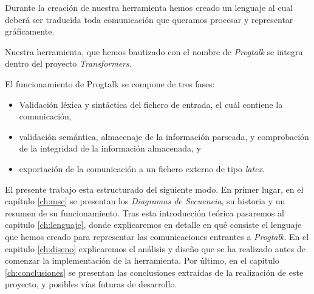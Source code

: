 Durante la creación de nuestra herramienta hemos creado un lenguaje 
al cual deberá ser traducida toda comunicación que queramos procesar y
representar gráficamente.

Nuestra herramienta, que hemos bautizado con el nombre de
\textit{Progtalk} se integra dentro del proyecto \textit{Transformers}. 

El funcionamiento de Progtalk se compone de tres fases:

\begin{itemize}
\item Validación léxica y sintáctica del fichero de entrada, el cuál
  contiene la comunicación,
\item validación semántica, almacenaje de la información parseada, y
  comprobación de la integridad de la información almacenada, y
\item exportación de la comunicación a un fichero externo de tipo
  \textit{latex}.
\end{itemize}

El presente trabajo esta estructurado del siguiente modo. En primer
lugar, en el capítulo \ref{ch:msc} se presentan los \textit{Diagramas
  de Secuencia}, su historia y un resumen de su funcionamiento. Tras
esta introducción teórica pasaremos al capitulo \ref{ch:lenguaje},
donde explicaremos en detalle en qué consiste el lenguaje que hemos
creado para representar las comunicaciones entrantes a
\textit{Progtalk}. En el capitulo \ref{ch:diseno} explicaremos el
análisis y diseño que se ha realizado antes de comenzar la
implementación de la herramienta. Por último, en el capitulo
\ref{ch:conclusiones} se presentan las conclusiones extraídas de la
realización de este proyecto, y posibles vías futuras de desarrollo.

